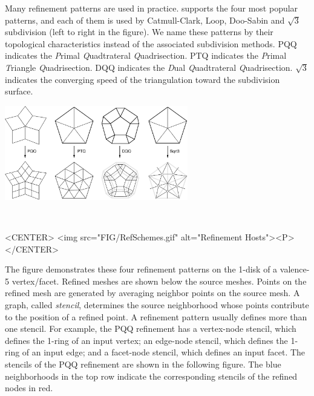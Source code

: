 Many refinement patterns are used in practice. 
 supports the four most popular 
patterns, and each of them is used by 
Catmull-Clark\cite{cgal:cc-rgbss-78}, Loop, Doo-Sabin 
and $\sqrt{3}$ subdivision (left to right in the 
figure). We name these patterns by their topological
characteristics instead of the associated subdivision methods. 
PQQ indicates the \emph{P}rimal \emph{Q}uadtrateral \emph{Q}uadrisection. 
PTQ indicates the \emph{P}rimal \emph{T}riangle \emph{Q}uadrisection. 
DQQ indicates the \emph{D}ual \emph{Q}uadtrateral \emph{Q}uadrisection.
$\sqrt{3}$ indicates the converging speed of the triangulation toward
the subdivision surface.

\begin{ccTexOnly}
  \begin{center}
    \parbox{0.6\textwidth}{%
      \includegraphics[width=0.6\textwidth]{Subdivision_method_3/FIG/RefSchemes}%
    }\\ \vspace{0.5cm}
  \end{center}
\end{ccTexOnly}

\begin{ccHtmlOnly}
  <CENTER>
     <img src="FIG/RefSchemes.gif" alt="Refinement Hosts"><P>
  </CENTER>
\end{ccHtmlOnly}

The figure demonstrates these four refinement patterns on 
the 1-disk of a valence-5 vertex/facet.
Refined meshes are shown below the source meshes. 
Points on the refined mesh are generated by averaging
neighbor points on the source mesh. A graph, called \emph{stencil}, 
determines the source neighborhood whose points contribute to the 
position of a refined point. A refinement pattern usually defines 
more than one stencil.
For example, the PQQ
refinement has a vertex-node stencil, 
which defines the 1-ring of an input vertex; an edge-node stencil, 
which defines the 1-ring of an input edge; and a facet-node stencil, 
which defines an input facet. The stencils of the PQQ refinement are
shown in the following figure. The blue neighborhoods in the 
top row indicate the corresponding stencils of the refined nodes 
in red. 

